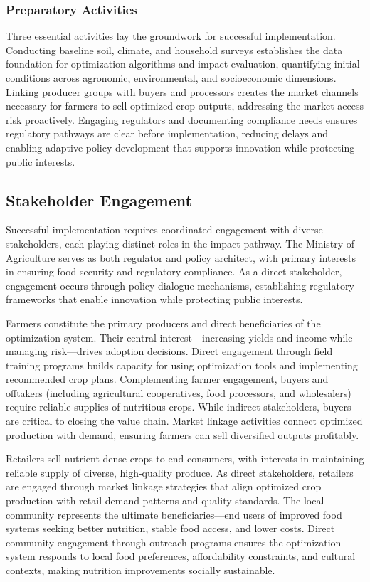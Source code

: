 \documentclass{oqireport}
\begin{document}
\subsubsection{Preparatory Activities}

Three essential activities lay the groundwork for successful implementation. Conducting baseline soil, climate, and household surveys establishes the data foundation for optimization algorithms and impact evaluation, quantifying initial conditions across agronomic, environmental, and socioeconomic dimensions. Linking producer groups with buyers and processors creates the market channels necessary for farmers to sell optimized crop outputs, addressing the market access risk proactively. Engaging regulators and documenting compliance needs ensures regulatory pathways are clear before implementation, reducing delays and enabling adaptive policy development that supports innovation while protecting public interests.

\subsection{Stakeholder Engagement}

Successful implementation requires coordinated engagement with diverse stakeholders, each playing distinct roles in the impact pathway. The Ministry of Agriculture serves as both regulator and policy architect, with primary interests in ensuring food security and regulatory compliance. As a direct stakeholder, engagement occurs through policy dialogue mechanisms, establishing regulatory frameworks that enable innovation while protecting public interests.

Farmers constitute the primary producers and direct beneficiaries of the optimization system. Their central interest—increasing yields and income while managing risk—drives adoption decisions. Direct engagement through field training programs builds capacity for using optimization tools and implementing recommended crop plans. Complementing farmer engagement, buyers and offtakers (including agricultural cooperatives, food processors, and wholesalers) require reliable supplies of nutritious crops. While indirect stakeholders, buyers are critical to closing the value chain. Market linkage activities connect optimized production with demand, ensuring farmers can sell diversified outputs profitably.

Retailers sell nutrient-dense crops to end consumers, with interests in maintaining reliable supply of diverse, high-quality produce. As direct stakeholders, retailers are engaged through market linkage strategies that align optimized crop production with retail demand patterns and quality standards. The local community represents the ultimate beneficiaries—end users of improved food systems seeking better nutrition, stable food access, and lower costs. Direct community engagement through outreach programs ensures the optimization system responds to local food preferences, affordability constraints, and cultural contexts, making nutrition improvements socially sustainable.
\end{document}
